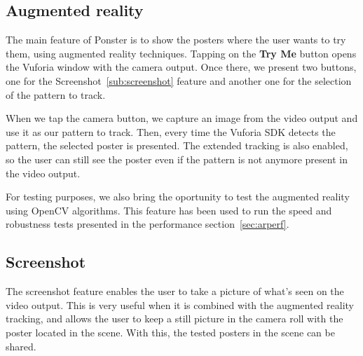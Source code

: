 \subsection*{Augmented reality}
The main feature of Ponster is to show the posters where the user wants to try
them, using augmented reality techniques. Tapping on the \textbf{Try Me} button
opens the Vuforia window with the camera output. Once there, we present two
buttons, one for the Screenshot~\ref{sub:screenshot} feature and another one
for the selection of the pattern to track. 

When we tap the camera button, we capture an image from the video output and
use it as our pattern to track. Then, every time the Vuforia SDK detects the
pattern, the selected poster is presented. The extended tracking is also
enabled, so the user can still see the poster even if the pattern is not
anymore present in the video output.

For testing purposes, we also bring the oportunity to test the augmented
reality using OpenCV algorithms. This feature has been used to run the speed
and robustness tests presented in the performance section~\ref{sec:arperf}.

\subsection*{Screenshot}
\label{sub:screenshot}
The screenshot feature enables the user to take a picture of what's seen on the
video output. This is very useful when it is combined with the augmented
reality tracking, and allows the user to keep a still picture in the camera
roll with the poster located in the scene. With this, the tested posters in the
scene can be shared.

